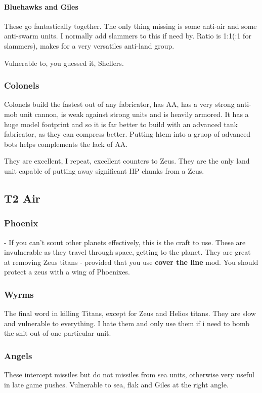 \documentclass[]{article}
\begin{document}
\paragraph{Bluehawks and Giles}

These go fantastically together.  The only thing missing is some anti-air and some anti-swarm units.  I normally add slammers to this if need by.  Ratio is 1:1(:1 for slammers), makes for a very versatiles anti-land group.  

Vulnerable to, you guessed it, Shellers.  


\subsubsection{Colonels}
Colonels build the fastest out of any fabricator, has AA, has a very strong anti-mob unit cannon, is weak against strong units and is heavily armored.  It has a huge model footprint and so it is far better to build with an advanced tank fabricator, as they can compress better.  Putting htem into a gruop of advanced bots helps complements the lack of AA.  

They are excellent, I repeat, excellent counters to Zeus.  They are the only land unit capable of putting away significant HP chunks from a Zeus.  


\subsection{T2 Air}


\subsubsection{Phoenix} - If you can't scout other planets effectively, this is the craft to use.  These are invulnerable as they travel through space, getting to the planet.  They are great at removing Zeus titans - provided that you use \textbf{cover the line} mod.  You should protect a zeus with a wing of Phoenixes.  

\subsubsection{Wyrms}  The final word in killing Titans, except for Zeus and Helios titans.  They are slow and vulnerable to everything.  I hate them and only use them if i need to bomb the shit out of one particular unit.  

\subsubsection{Angels} These intercept missiles but do not missiles from sea units, otherwise very useful in late game pushes.   Vulnerable to sea, flak and Giles at the right angle.  
\end{document}
